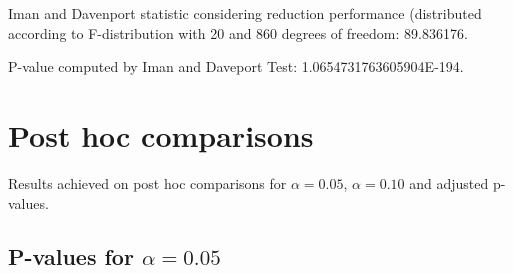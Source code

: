 \documentclass[a4paper,10pt]{article}
\begin{document}
\begin{landscape}
Iman and Davenport statistic considering reduction performance (distributed according to F-distribution with 20 and 860 degrees of freedom: 89.836176.

P-value computed by Iman and Daveport Test: 1.0654731763605904E-194.\newline



\pagebreak

\section{Post hoc comparisons}

Results achieved on post hoc comparisons for $\alpha = 0.05$, $\alpha = 0.10$ and adjusted p-values.

\subsection{P-values for $\alpha=0.05$}


\end{landscape}
\end{document}
